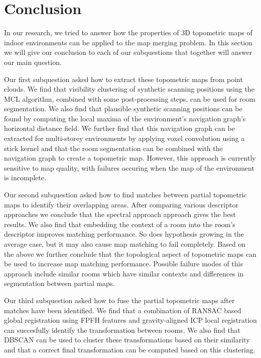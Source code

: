 

\pagebreak

\section{Conclusion}
In our research, we tried to answer how the properties of 3D topometric maps of indoor environments can be applied to the map merging problem. In this section we will give our conclusion to each of our subquestions that together will answer our main question.

Our first subquestion asked how to extract these topometric maps from point clouds. We find that visibility clustering of synthetic scanning positions using the MCL algorithm, combined with some post-processing steps, can be used for room segmentation. We also find that plausible synthetic scanning positions can be found by computing the local maxima of the environment's navigation graph's horizontal distance field. We further find that this navigation graph can be extracted for multi-storey environments by applying voxel convolution using a stick kernel and that the room segmentation can be combined with the navigation graph to create a topometric map. However, this approach is currently sensitive to map quality, with failures occuring when the map of the environment is incomplete.

Our second subquestion asked how to find matches between partial topometric maps to identify their overlapping areas. After comparing various descriptor approaches we conclude that the spectral approach approach gives the best results. We also find that embedding the context of a room into the room's descriptor improves matching performance. So does hypothesis growing in the average case, but it may also cause map matching to fail completely. Based on the above we further conclude that the topological aspect of topometric maps can be used to increase map matching performance. Possible failure modes of this approach include similar rooms which have similar contexts and differences in segmentation between partial maps.

Our third subquestion asked how to fuse the partial topometric maps after matches have been identified. We find that a combination of RANSAC based global registration using FPFH features and gravity-aligned ICP local registration can succesfully identify the transformation between rooms. We also find that DBSCAN can be used to cluster these transformations based on their similarity and that a correct final transformation can be computed based on this clustering. 

